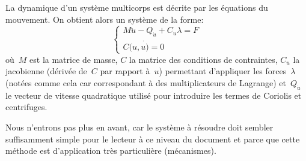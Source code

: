 \medskip
La dynamique d'un système multicorps est décrite par les équations du mouvement.
On obtient alors un système de la forme:
\begin{equation}
\left\{
\begin{array}{l}
M \ddot{u} - Q_{\dot{u}} + C_u\lambda = F\\
C(u,\dot{u)}=0
\end{array}
\right.
\end{equation}
où~$M$ est la matrice de masse, $C$ la matrice des conditions de contraintes, $C_u$ la jacobienne
(dérivée de~$C$ par rapport à~$u$) permettant d'appliquer les forces~$\lambda$ (notées
comme cela car correspondant à des multiplicateurs de Lagrange) et~$Q_{\dot{u}}$ le vecteur
de vitesse quadratique utilisé pour introduire les termes de Coriolis et centrifuges.

\medskip
Nous n'entrons pas plus en avant, car le système à résoudre doit sembler suffisamment
simple pour le lecteur à ce niveau du document et parce que cette méthode
est d'application très particulière (mécanismes).
